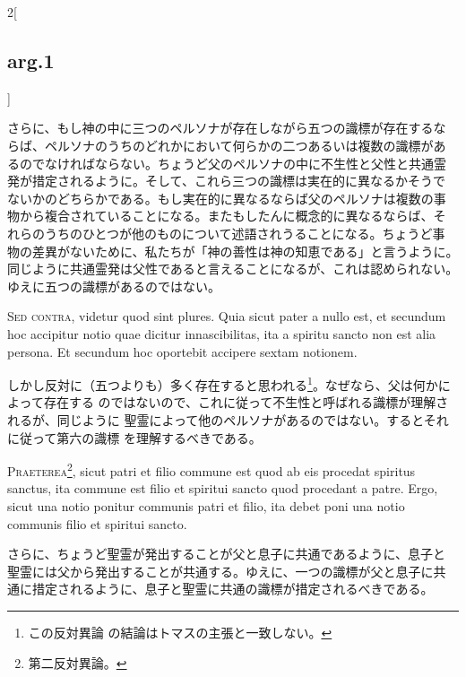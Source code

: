 \documentclass[paper=a4paper,fontsize=10pt,jafontsize=9pt,titlepage]{jlreq}
\begin{document}
\begin{paracol}{2}[\subsection{arg.1}]
\switchcolumn

さらに、もし神の中に三つのペルソナが存在しながら五つの識標が存在するな
らば、ペルソナのうちのどれかにおいて何らかの二つあるいは複数の識標があ
るのでなければならない。ちょうど父のペルソナの中に不生性と父性と共通霊
発が措定されるように。そして、これら三つの識標は実在的に異なるかそうで
ないかのどちらかである。もし実在的に異なるならば父のペルソナは複数の事
物から複合されていることになる。またもしたんに概念的に異なるならば、そ
れらのうちのひとつが他のものについて述語されうることになる。ちょうど事
物の差異がないために、私たちが「神の善性は神の知恵である」と言うように。
同じように共通霊発は父性であると言えることになるが、これは認められない。
ゆえに五つの識標があるのではない。

\switchcolumn*[\subsection{s.c.1}]

{\scshape Sed contra}, videtur quod sint plures. Quia sicut pater a nullo est, et
secundum hoc accipitur notio quae dicitur innascibilitas, ita a
spiritu sancto non est alia persona. Et secundum hoc oportebit
accipere sextam notionem.

\switchcolumn

しかし反対に（五つよりも）多く存在すると思われる\footnote{この反対異論
の結論はトマスの主張と一致しない。}。なぜなら、父は何かによって存在する
のではないので、これに従って不生性と呼ばれる識標が理解されるが、同じように
聖霊によって他のペルソナがあるのではない。するとそれに従って第六の識標
を理解するべきである。

\switchcolumn*[\subsection{s.c.2}]

{\scshape Praeterea}\footnote{第二反対異論。}, sicut patri et filio commune est quod ab eis procedat
spiritus sanctus, ita commune est filio et spiritui sancto quod
procedant a patre. Ergo, sicut una notio ponitur communis patri et
filio, ita debet poni una notio communis filio et spiritui sancto.

\switchcolumn

さらに、ちょうど聖霊が発出することが父と息子に共通であるように、息子と
聖霊には父から発出することが共通する。ゆえに、一つの識標が父と息子に共
通に措定されるように、息子と聖霊に共通の識標が措定されるべきである。



\end{paracol}
\end{document}
